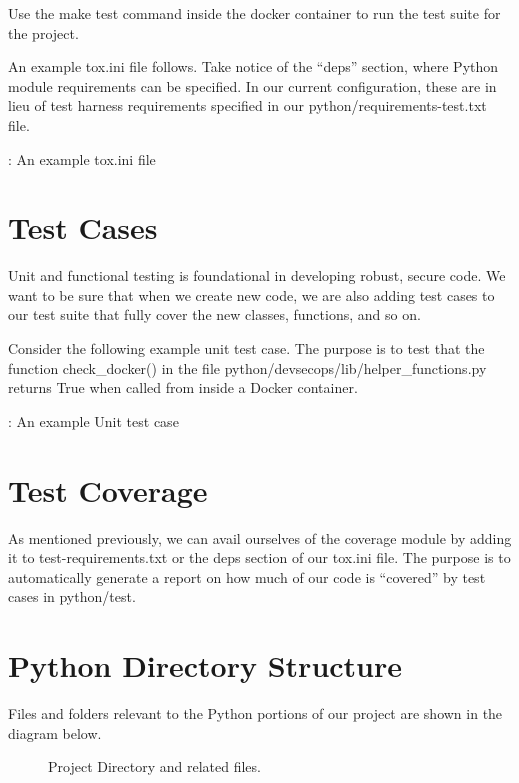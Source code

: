 \justify{}
Use the make test command inside the docker container to run the test suite for the project.

\justify{}
An example tox.ini file follows. Take notice of the ``deps'' section,
where Python module requirements can be specified. In our current configuration,
these are in lieu of test harness requirements specified in our
python/requirements-test.txt file.

\begin{mybox}{\thetcbcounter: An example tox.ini file}
  
\end{mybox}

\section{Test Cases}

\justify{}
Unit and functional testing is foundational in developing robust, secure
code. We want to be sure that when we create new code, we are also adding
test cases to our test suite that fully cover the new classes, functions, and so on.


\justify{}
Consider the following example unit test case. The purpose is to test
that the function check\_docker() in the file python/devsecops/lib/helper\_functions.py 
returns True when called from inside a Docker container.

\begin{mybox}{\thetcbcounter: An example Unit test case}
  
\end{mybox}

\section{Test Coverage}

\justify{}
As mentioned previously, we can avail ourselves of the coverage module by adding it to test-requirements.txt or the deps section of our tox.ini file. The purpose is to automatically generate a report on how much of
our code is ``covered'' by test cases in python/test.

\section{Python Directory Structure}
\justify{}
Files and folders relevant to the Python portions of our project are shown in the diagram below.

\begin{figure}[!htb]
  \centering
  
  \caption{Project Directory and related files.}
\label{pythonfiles}
\end{figure}